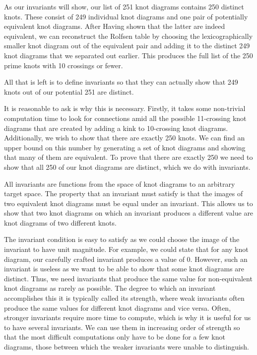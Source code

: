 \begin{paper}

As our invariants will show, our list of 251 knot diagrams contains 250 distinct
knots.
These consist of 249 individual knot diagrams and one pair of potentially
equivalent knot diagrams.
After Having shown that the latter are indeed equivalent, we can reconstruct the
Rolfsen table by choosing the lexicographically smaller knot diagram out of the
equivalent pair and adding it to the distinct 249 knot diagrams that we
separated out earlier.
This produces the full list of the 250 prime knots with 10 crossings or fewer.

All that is left is to define invariants so that they can actually show that 249
knots out of our potential 251 are distinct.

It is reasonable to ask is why this is necessary.
Firstly, it takes some non-trivial computation time to look for connections amid
all the possible 11-crossing knot diagrams that are created by adding a kink to
10-crossing knot diagrams.
Additionally, we wish to show that there are exactly 250 knots.
We can find an upper bound on this number by generating a set of knot diagrams
and showing that many of them are equivalent.
To prove that there are exactly 250 we need to show that all 250 of our knot
diagrams are distinct, which we do with invariants.


All invariants are functions from the space of knot diagrams to an arbitrary
target space.
The property that an invariant must satisfy is that the images of two equivalent
knot diagrams must be equal under an invariant.
This allows us to show that two knot diagrams on which an invariant produces a
different value are knot diagrams of two different knots.

The invariant condition is easy to satisfy as we could choose the image of the
invariant to have unit magnitude.
For example, we could state that for any knot diagram, our carefully crafted
invariant produces a value of 0.
However, such an invariant is useless as we want to be able to show that some
knot diagrams are distinct.
Thus, we need invariants that produce the same value for non-equivalent knot
diagrams as rarely as possible.
The degree to which an invariant accomplishes this it is typically called its
strength, where weak invariants often produce the same values for different knot
diagrams and vice versa.
Often, stronger invariants require more time to compute, which is why it is
useful for us to have several invariants.
We can use them in increasing order of strength so that the most difficult
computations only have to be done for a few knot diagrams, those between which
the weaker invariants were unable to distinguish.


\end{paper}
